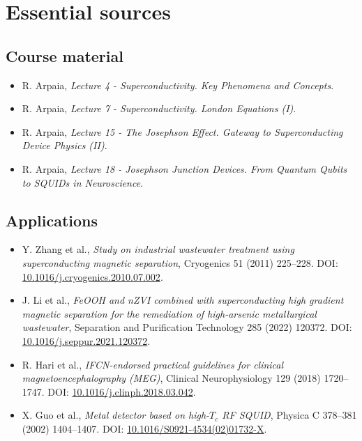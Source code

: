 \documentclass[11pt,a4paper]{article}
\begin{document}
\section{Essential sources}

\subsection{Course material}
\begin{itemize}
  \item R. Arpaia, \textit{Lecture 4 - Superconductivity. Key Phenomena and Concepts}.
  \item R. Arpaia, \textit{Lecture 7 - Superconductivity. London Equations (I)}.
  \item R. Arpaia, \textit{Lecture 15 - The Josephson Effect. Gateway to Superconducting Device Physics (II)}.
  \item R. Arpaia, \textit{Lecture 18 - Josephson Junction Devices. From Quantum Qubits to SQUIDs in Neuroscience}.
\end{itemize}

\subsection{Applications}
\begin{itemize}
  \item Y. Zhang et al., \textit{Study on industrial wastewater treatment using superconducting magnetic separation}, Cryogenics 51 (2011) 225--228. DOI: \href{https://doi.org/10.1016/j.cryogenics.2010.07.002}{10.1016/j.cryogenics.2010.07.002}.
  \item J. Li et al., \textit{FeOOH and nZVI combined with superconducting high gradient magnetic separation for the remediation of high-arsenic metallurgical wastewater}, Separation and Purification Technology 285 (2022) 120372. DOI: \href{https://doi.org/10.1016/j.seppur.2021.120372}{10.1016/j.seppur.2021.120372}.
  \item R. Hari et al., \textit{IFCN-endorsed practical guidelines for clinical magnetoencephalography (MEG)}, Clinical Neurophysiology 129 (2018) 1720--1747. DOI: \href{https://doi.org/10.1016/j.clinph.2018.03.042}{10.1016/j.clinph.2018.03.042}.
  \item X. Guo et al., \textit{Metal detector based on high-$T_c$ RF SQUID}, Physica C 378--381 (2002) 1404--1407. DOI: \href{https://doi.org/10.1016/S0921-4534(02)01732-X}{10.1016/S0921-4534(02)01732-X}.
\end{itemize}
\end{document}
